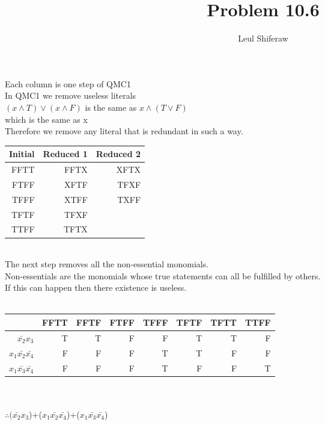 \documentclass[a4paper]{article}
\title{Problem 10.6}
\author{Leul Shiferaw}
\begin{document}
\maketitle
\newpage
{}

Each column is one step of QMC1\\
In QMC1 we remove useless literals\\
$(x\wedge T)\vee (x\wedge F)$ is the same as $x \wedge (T\vee F)$\\
which is the same as x\\
Therefore we remove any literal that is redundant in such a way.\\
\begin{tabular}{|r|r|r|}
	\hline
	Initial&Reduced 1&Reduced 2\\
	\hline
	FFTT&FFTX&XFTX\\
	FTFF&XFTF&TFXF\\
	TFFF&XTFF&TXFF\\
	TFTF&TFXF&\\
	TTFF&TFTX&\\
	\hline
\end{tabular}
\\The next step removes all the non-essential monomials.\\
Non-essentials are the monomials whose true statements can all be fulfilled by others.\\
If this can happen then there existence is useless.\\\\

\begin{tabular}{|r|r|r|r|r|r|r|r|}
	\hline
	&FFTT&FFTF&FTFF&TFFF&TFTF&TFTT&TTFF\\
	\hline
	$\bar{x_2}x_3$&T&T&F&F&T&T&F\\
	$x_1\bar{x_2}\bar{x_4}$&F&F&F&T&T&F&F\\
	$x_1\bar{x_3}\bar{x_4}$&F&F&F&T&F&F&T\\
	\hline
\end{tabular}
\\\\
$\therefore(\bar{x_2}x_3$)+($x_1\bar{x_2}\bar{x_4}$)+($x_1\bar{x_3}\bar{x_4}$)
\end{document}
